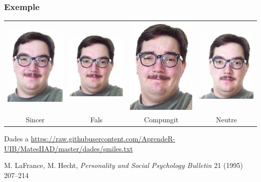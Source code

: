 \documentclass[12pt,t]{beamer}
\newcommand{\blue}[1]{\textcolor{blue}{#1}}
\theoremstyle{plain}
\theoremstyle{definition}
\begin{document}
\begin{frame}
\frametitle{Exemple}


\begin{center}
\hspace*{-0.5cm}\begin{tabular}{cccc}
\includegraphics[width=0.24\linewidth]{felt} & 
\includegraphics[width=0.26\linewidth]{false} & 
\includegraphics[width=0.22\linewidth]{miserable} & 
\includegraphics[width=0.25\linewidth]{neutral}\\
Sincer & Fals & Compungit & Neutre
\end{tabular}
\end{center}\pause

Dades a \blue{\url{https://raw.githubusercontent.com/AprendeR-UIB/MatesIIAD/master/dades/smiles.txt}}\vspace*{1cm}

{\tiny M. LaFrance, M. Hecht, \textsl{Personality and Social Psychology Bulletin} 21 (1995) 207--214

}
\end{frame}
\end{document}
